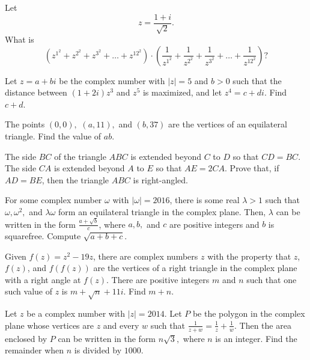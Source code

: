 \documentclass[mast]{lucky}
\begin{document}
\begin{prob}[AMC 12A 2019/21]{4}
Let\[z=\frac{1+i}{\sqrt{2}}.\]What is\[\left(z^{1^2}+z^{2^2}+z^{3^2}+\dots+z^{{12}^2}\right) \cdot \left(\frac{1}{z^{1^2}}+\frac{1}{z^{2^2}}+\frac{1}{z^{3^2}}+\dots+\frac{1}{z^{{12}^2}}\right)?\]
\end{prob}

\begin{req}[AIME II 2012/6]{4}
Let $z = a + bi$ be the complex number with $|z| = 5$ and $b > 0$ such that the distance between $(1 + 2i)z^3$ and $z^5$ is maximized, and let $z^4 = c + di$. Find $c+d$.
\end{req}

\begin{prob}[AIME 1994/8]{4}
The points $(0,0),$ $(a,11),$ and $(b,37)$ are the vertices of an equilateral triangle. Find the value of $ab.$
\end{prob}   

\begin{prob}[EGMO 2013/1]{4}
The side $BC$ of the triangle $ABC$ is extended beyond $C$ to $D$ so that $CD = BC$. The side $CA$ is extended beyond $A$ to $E$ so that $AE = 2CA$. Prove that, if $AD=BE$, then the triangle $ABC$ is right-angled.
\end{prob}

\begin{req}{6}
For some complex number $\omega$ with $|\omega| = 2016$, there is some real $\lambda>1$ such that $\omega, \omega^{2},$ and $\lambda \omega$ form an equilateral triangle in the complex plane. Then, $\lambda$ can be written in the form $\tfrac{a + \sqrt{b}}{c}$, where $a,b,$ and $c$ are positive integers and $b$ is squarefree. Compute $\sqrt{a+b+c}$.
\end{req}

\begin{prob}[AIME I 2019/12]{6}
Given $f(z) = z^2-19z$, there are complex numbers $z$ with the property that $z$, $f(z)$, and $f(f(z))$ are the vertices of a right triangle in the complex plane with a right angle at $f(z)$. There are positive integers $m$ and $n$ such that one such value of $z$ is $m+\sqrt{n}+11i$. Find $m+n$.
\end{prob}

\begin{prob}[AIME II 2014/10]{6}
Let $z$ be a complex number with $|z| = 2014$. Let $P$ be the polygon in the complex plane whose vertices are $z$ and every $w$ such that $\tfrac{1}{z+w} = \tfrac{1}{z} + \tfrac{1}{w}$. Then the area enclosed by $P$ can be written in the form $n\sqrt{3},$ where $n$ is an integer. Find the remainder when $n$ is divided by $1000$.
\end{prob}
\end{document}
